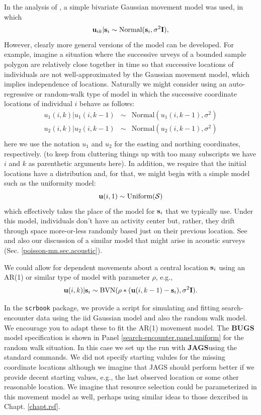 In the analysis of \citet{royle_young:2008}, a simple bivariate
Gaussian movement model was used, in which
\[
 {\bf u}_{ik} | {\bf s}_{i} \sim \mbox{Normal}({\bf s}_{i}, \sigma^{2}{\bf I}),
\]
However, clearly more general versions of the model can be developed.
For example, imagine a situation where the successive urveys of a
bounded sample polygon are relatively close together in time so that
successive locations of individuals are not well-approximated by the
Gaussian movement model, which implies independence of locations. Naturally we might consider using an
auto-regressive or random-walk type of model in which the successive
coordinate locations of individual $i$ behave as follows:
\begin{eqnarray*}
 u_{1}(i,k) | u_{1}(i,k-1) &\sim &  \mbox{Normal}( u_{1}(i,k-1),  \sigma^{2}) \\
 u_{2}(i,k) | u_{2}(i,k-1) &\sim &  \mbox{Normal}( u_{2}(i,k-1),  \sigma^{2}) \\
\end{eqnarray*}
here we use the notation $u_{1}$ and $u_{2}$ for the easting and
northing coordinates, respectively. (to keep from cluttering things up
with too many subscripts we have $i$ and $k$ as parenthetic arguments
here).   In addition, we require that the initial locations have a
distribution and, for that, we might begin with a simple model such as
the uniformity model:
\[
 {\bf u}(i,1) \sim \mbox{Uniform}({\cal S})
\]
which effectively takes the place of the model for ${\bf s}_{i}$ that
we typically use. Under this model, individuals don't have an activity
center but, rather, they drift through space more-or-less randomly
based just on their previous location. See \citet{ovaskainen:2004,
  ovaskainen:2008} 
and also our discussion of a similar model that
might arise in acoustic surveys (Sec. \ref{poisson-mn.sec.acoustic}).

We could allow for dependent movements about a central location ${\bf
  s}_{i}$ using an AR(1) 
or similar type of
model with parameter $\rho$, e.g.,
\[
 {\bf u}(i,k) | {\bf s}_{i} \sim   \mbox{BVN}( \rho*( {\bf u}(i,k-1) - {\bf s}_{i} ),  \sigma^{2} {\bf I}).
\]


In the \mbox{\tt scrbook} package, we provide a script for simulating
and fitting search-encounter data using the iid Gaussian model and
also the random walk model. We encourage you to adapt these to fit the
AR(1) movement model.  The {\bf BUGS} model specification is shown in
Panel \ref{search-encounter.panel.uniform} for the random walk
situation. In this case
we set
up the run with {\bf JAGS}using the standard commands. We did not specify
starting valules for the missing coordinate locations although we
imagine that JAGS should perform better if we provide decent starting
values, e.g., the last observed location or some other reasonable location.
 We imagine that resource selection  could
be parameterized in this movement model as well, perhaps
using similar ideas to those dexcribed in Chapt. \ref{chapt.rsf}. 


